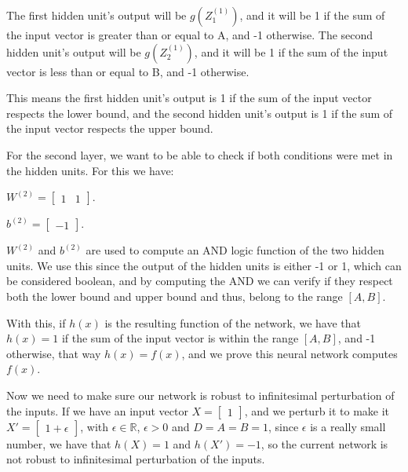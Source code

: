\documentclass{article}
\begin{document}
\bigskip

The first hidden unit's output will be $g(Z^{(1)}_1)$, and it will be 1 if the sum of the input vector is greater than or equal to A, 
and -1 otherwise.
The second hidden unit's output will be $g(Z^{(1)}_2)$, and it will be 1 if the sum of the input vector is less than or equal to B, 
and -1 otherwise.

This means the first hidden unit's output is 1 if the sum of the input vector respects the lower bound, 
and the second hidden unit's output is 1 if the sum of the input vector respects the upper bound.

For the second layer, we want to be able to check if both conditions were met in the hidden units. For this we have:

\bigskip

\( W^{(2)} = \begin{bmatrix}
    1 & 1
\end{bmatrix}
\).

\medskip

\(b^{(2)} = \begin{bmatrix}
    -1
\end{bmatrix}
\).

\bigskip

\(W^{(2)}\) and \(b^{(2)}\) are used to compute an AND logic function of the two hidden units. We use this since the output of
the hidden units is either -1 or 1, which can be considered boolean, and by computing the AND we can verify if they respect both the 
lower bound and upper bound and thus, belong to the range \([A, B]\). 

With this, if \(h(x)\) is the resulting function of the network, we have that \(h(x) = 1\) if the sum of the input vector is within the range \([A, B]\),
and -1 otherwise, that way \(h(x) = f(x)\), and we prove this neural network computes \(f(x)\).

\bigskip

Now we need to make sure our network is robust to infinitesimal perturbation of the inputs.
If we have an input vector $X = \begin{bmatrix}
    1
\end{bmatrix}
$, and we perturb it to make it $X' = \begin{bmatrix}
    1 + \epsilon
\end{bmatrix}
$, with $\epsilon \in \mathbb{R}$, $\epsilon > 0$ and $D = A = B = 1$, since $\epsilon$ is a really small number, 
we have that $h(X) = 1$ and $h(X') = -1$, so the current network is not robust to infinitesimal perturbation of the inputs.
\end{document}
